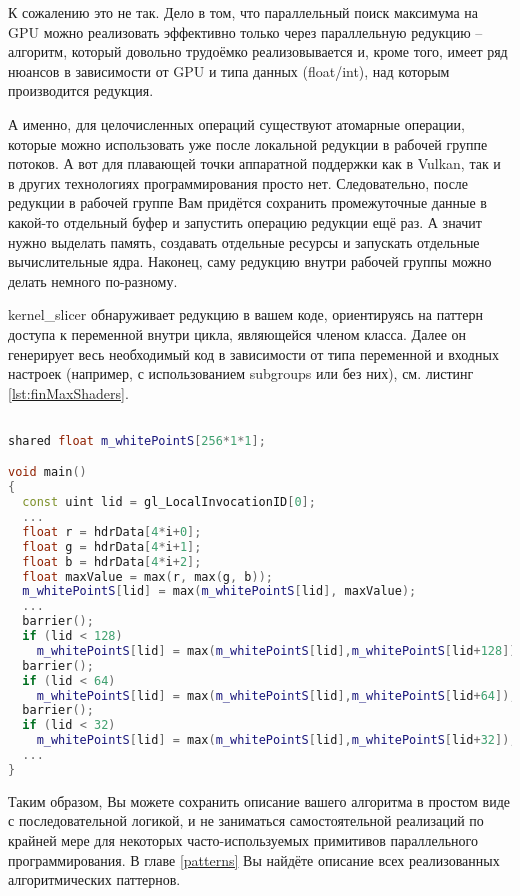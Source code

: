 \documentclass[11pt,fleqn,english,russian]{report} %
\begin{document}
К сожалению это не так. Дело в том, что параллельный поиск максимума на GPU можно реализовать эффективно только через параллельную редукцию -- алгоритм, который довольно трудоёмко реализовывается и, кроме того, имеет ряд нюансов в зависимости от GPU и типа данных (float/int), над которым производится редукция. 

А именно, для целочисленных операций существуют атомарные операции, которые можно использовать уже после локальной редукции в рабочей группе потоков. А вот для плавающей точки аппаратной поддержки как в Vulkan, так и в других технологиях программирования просто нет. Следовательно, после редукции в рабочей группе Вам придётся сохранить промежуточные данные в какой-то отдельный буфер и запустить операцию редукции ещё раз. А значит нужно выделать память, создавать отдельные ресурсы и запускать отдельные вычислительные ядра. Наконец, саму редукцию внутри рабочей группы можно делать немного по-разному.

kernel\_slicer обнаруживает редукцию в вашем коде, ориентируясь на паттерн доступа к переменной внутри цикла, являющейся членом класса. Далее он генерирует весь необходимый код в зависимости от типа переменной и входных настроек (например, с использованием subgroups или без них), см. листинг \ref{lst:finMaxShaders}.

\begin{lstlisting}[language=C++, 
	               caption=Фрагмент сгенерированного GLSL шейдера для параллельной редукции, 
	               label=lst:finMaxShaders]	

shared float m_whitePointS[256*1*1]; 

void main()
{	               
  const uint lid = gl_LocalInvocationID[0];
  ...	               
  float r = hdrData[4*i+0];
  float g = hdrData[4*i+1];
  float b = hdrData[4*i+2];
  float maxValue = max(r, max(g, b));
  m_whitePointS[lid] = max(m_whitePointS[lid], maxValue);
  ...
  barrier();
  if (lid < 128) 
  	m_whitePointS[lid] = max(m_whitePointS[lid],m_whitePointS[lid+128]);
  barrier();
  if (lid < 64) 
  	m_whitePointS[lid] = max(m_whitePointS[lid],m_whitePointS[lid+64]);
  barrier();
  if (lid < 32) 
  	m_whitePointS[lid] = max(m_whitePointS[lid],m_whitePointS[lid+32]);
  ...
}  
\end{lstlisting}

Таким образом, Вы можете сохранить описание вашего алгоритма в простом виде с последовательной логикой, и не заниматься самостоятельной реализаций по крайней мере для некоторых часто-используемых примитивов параллельного программирования. В главе \ref{patterns} Вы найдёте описание всех реализованных алгоритмических паттернов.
\end{document}
